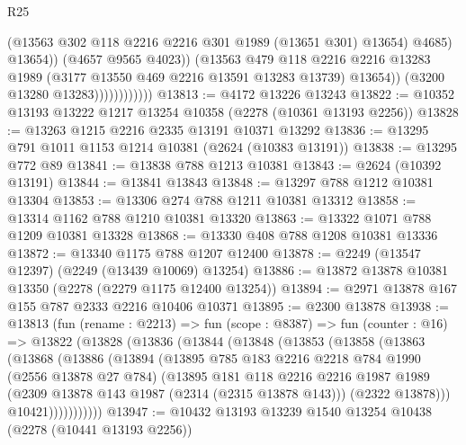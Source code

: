 \begin{lexlean}{R25}
\begin{coremodule}
                                    (@13563 @302 @118 @2216 @2216 @301 @1989 (@13651 @301) @13654)
                                    @4685)
                                  @13654))
                              (@4657 @9565 @4023))
                            (@13563
                              @479
                              @118
                              @2216
                              @2216
                              @13283
                              @1989
                              (@3177 @13550 @469 @2216 @13591 @13283 @13739)
                              @13654))
                          (@3200 @13280 @13283))))))))))))
@13813 := @4172 @13226 @13243
@13822 := @10352 @13193 @13222 @1217 @13254 @10358 (@2278 (@10361 @13193 @2256))
@13828 := @13263 @1215 @2216 @2335 @13191 @10371 @13292
@13836 := @13295 @791 @1011 @1153 @1214 @10381 (@2624 (@10383 @13191))
@13838 := @13295 @772 @89
@13841 := @13838 @788 @1213 @10381
@13843 := @2624 (@10392 @13191)
@13844 := @13841 @13843
@13848 := @13297 @788 @1212 @10381 @13304
@13853 := @13306 @274 @788 @1211 @10381 @13312
@13858 := @13314 @1162 @788 @1210 @10381 @13320
@13863 := @13322 @1071 @788 @1209 @10381 @13328
@13868 := @13330 @408 @788 @1208 @10381 @13336
@13872 := @13340 @1175 @788 @1207 @12400
@13878 := @2249 (@13547 @12397) (@2249 (@13439 @10069) @13254)
@13886 := @13872 @13878 @10381 @13350 (@2278 (@2279 @1175 @12400 @13254))
@13894 := @2971 @13878 @167 @155 @787 @2333 @2216 @10406 @10371
@13895 := @2300 @13878
@13938 := @13813
    (fun (rename : @2213) =>
    fun (scope : @8387) =>
    fun (counter : @16) =>
    @13822
      (@13828
        (@13836
          (@13844
            (@13848
              (@13853
                (@13858
                  (@13863
                    (@13868
                      (@13886
                        (@13894
                          (@13895
                            @785
                            @183
                            @2216
                            @2218
                            @784
                            @1990
                            (@2556 @13878 @27 @784)
                            (@13895
                              @181
                              @118
                              @2216
                              @2216
                              @1987
                              @1989
                              (@2309 @13878 @143 @1987 (@2314 (@2315 @13878 @143)))
                              (@2322 @13878)))
                          @10421)))))))))))
@13947 := @10432 @13193 @13239 @1540 @13254 @10438 (@2278 (@10441 @13193 @2256))

\end{coremodule}
\end{lexlean}
